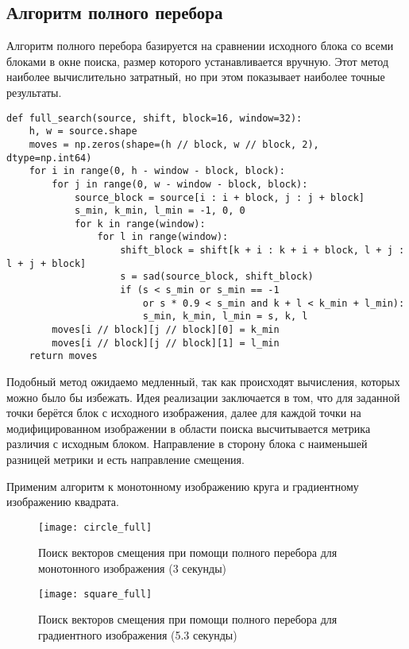 \subsection{Алгоритм полного перебора}

Алгоритм полного перебора базируется на сравнении исходного
блока со всеми блоками в окне поиска, размер которого устанавливается вручную. Этот метод наиболее вычислительно затратный, но при этом показывает наиболее точные результаты.

\begin{lstlisting}[caption={Поиск векторов смещения при помощи полного перебора}]
def full_search(source, shift, block=16, window=32):
	h, w = source.shape
	moves = np.zeros(shape=(h // block, w // block, 2), dtype=np.int64)
	for i in range(0, h - window - block, block):
		for j in range(0, w - window - block, block):
			source_block = source[i : i + block, j : j + block]
			s_min, k_min, l_min = -1, 0, 0  
			for k in range(window):
				for l in range(window):
					shift_block = shift[k + i : k + i + block, l + j : l + j + block]
					s = sad(source_block, shift_block)
					if (s < s_min or s_min == -1
						or s * 0.9 < s_min and k + l < k_min + l_min):
						s_min, k_min, l_min = s, k, l
		moves[i // block][j // block][0] = k_min
		moves[i // block][j // block][1] = l_min
	return moves
\end{lstlisting}

Подобный метод ожидаемо медленный, так как происходят вычисления, которых можно было бы избежать. Идея реализации заключается в том, что для заданной точки берётся блок с исходного изображения, далее для каждой точки на модифицированном изображении в области поиска высчитывается метрика различия с исходным блоком. Направление в сторону блока с наименьшей разницей метрики и есть направление смещения.

Применим алгоритм к монотонному изображению круга и градиентному изображению квадрата.

\begin{figure}[H]
	\centering
	\texttt{[image: circle\_full]}
	\caption{Поиск векторов смещения при помощи полного перебора для монотонного изображения (3 секунды)}
\end{figure}

\begin{figure}[H]
	\centering
	\texttt{[image: square\_full]}
	\caption{Поиск векторов смещения при помощи полного перебора для градиентного изображения (5.3 секунды)}
\end{figure}

